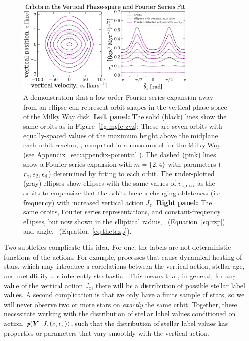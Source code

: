 \begin{figure}[t!]
\begin{center}
\includegraphics[width=0.8\textwidth]{simulated-orbits-fourier.pdf}
\end{center}
\caption{%
A demonstration that a low-order Fourier series expansion away from an ellipse can
represent orbit shapes in the vertical phase space of the Milky Way disk.
\textbf{Left panel:} The solid (black) lines show the same orbits as in
Figure~\ref{fig:mgfe-zvz}: These are seven orbits with equally-spaced values of the
maximum height above the midplane each orbit reaches, \zmax, computed in a mass model
for the Milky Way (see Appendix~\ref{sec:appendix-potential}).
The dashed (pink) lines show a Fourier series expansion with $m=\{2, 4\}$ with
parameters ($r_z, e_2, e_4$) determined by fitting to each orbit.
The under-plotted (gray) ellipses show ellipses with the same values of $v_{z,
\textrm{max}}$ as the orbits to emphasize that the orbits have a changing oblateness
(i.e. frequency) with increased vertical action $J_z$.
\textbf{Right panel:} The same orbits, Fourier series representations, and
constant-frequency ellipses, but now shown in the elliptical radius, \rzp\
(Equation~\ref{eq:rzp}) and angle, \thzp\ (Equation~\ref{eq:thetazp}).
\label{fig:fourier-contours}
}
\end{figure}

Two subtleties complicate this idea.
For one, the labels are not deterministic functions of the actions.
For example, processes that cause dynamical heating of stars, which may introduce a
correlations between the vertical action, stellar age, and metallicity are inherently
stochastic \citep{TODO}.
This means that, in general, for any value of the vertical action $J_z$, there will be
a distribution of possible stellar label values.
A second complication is that we only have a finite sample of stars, so we will
never observe two or more stars on \emph{exactly} the same orbit.
Together, these necessitate working with the distribution of stellar label values
conditioned on action, $p(\boldsymbol{Y} \,|\, J_z(z, v_z))$, such that the distribution of
stellar label values has properties or parameters that vary smoothly with the vertical
action.

